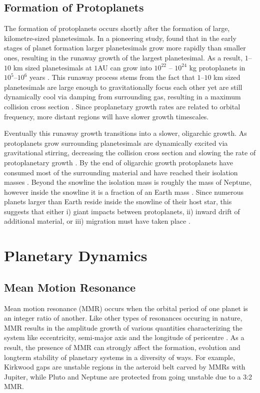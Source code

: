 \subsection{Formation of Protoplanets}
The formation of protoplanets occurs shortly after the formation of large, kilometre-sized planetesimals.
In a pioneering study, \citet{Greenberg1978} found that in the early stages of planet formation larger planetesimals grow more rapidly than smaller ones, resulting in the runaway growth of the largest planetesimal. 
As a result, $1$--$10$ km sized planetesimals at $1$AU can grow into $10^{22}$ -- $10^{24}$ kg protoplanets in $10^5$--$10^6$ years \citep{Wetherill1989}.
This runaway process stems from the fact that $1$--$10$ km sized planetesimals are large enough to gravitationally focus each other yet are still dynamically cool via damping from surrounding gas, resulting in a maximum collision cross section \citep{Armitage2010}.
Since proplanetary growth rates are related to orbital frequency, more distant regions will have slower growth timescales.

Eventually this runaway growth transitions into a slower, oligarchic growth. 
As protoplanets grow surrounding planetesimals are dynamically excited via gravitational stirring, decreasing the collision cross section and slowing the rate of protoplanetary growth \citep{Kokubo1998}.
By the end of oligarchic growth protoplanets have consumed most of the surrounding material and have reached their isolation masses \citep{Schlichting2014}.
Beyond the snowline the isolation mass is roughly the mass of Neptune, however inside the snowline it is a fraction of an Earth mass \citep{Schlichting2014}.
Since numerous \kep planets larger than Earth reside inside the snowline of their host star, this suggests that either i) giant impacts between protoplanets, ii) inward drift of additional material, or iii) migration must have taken place \citep{Schlichting2014}.  

\section{Planetary Dynamics}
\subsection{Mean Motion Resonance}
\label{sec:MMR}
Mean motion resonance (MMR) occurs when the orbital period of one planet is an integer ratio of another. 
Like other types of resonances occuring in nature, MMR results in the amplitude growth of various quantities characterizing the system like eccentricity, semi-major axis and the longitude of pericentre \citep{SSD1999}. 
As a result, the presence of MMR can strongly affect the formation, evolution and longterm stability of planetary systems in a diversity of ways.
For example, Kirkwood gaps are unstable regions in the asteroid belt carved by MMRs with Jupiter, while Pluto and Neptune are protected from going unstable due to a 3:2 MMR. 

